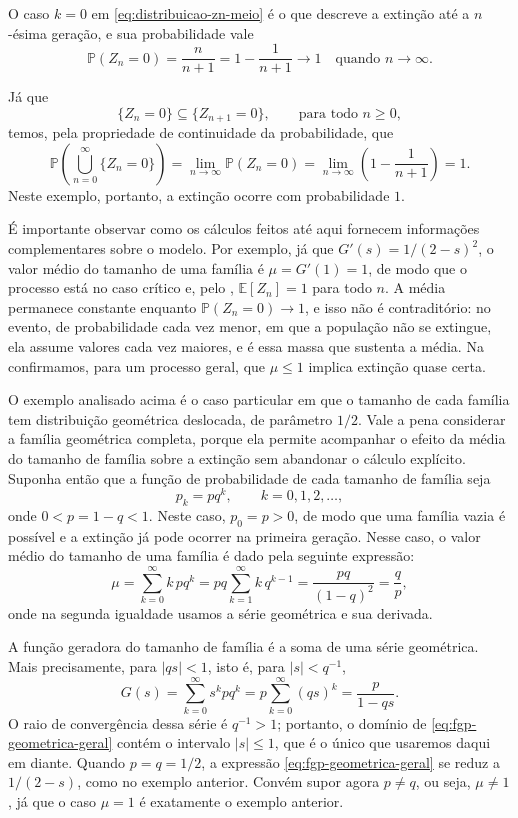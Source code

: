 \documentclass[12pt,portuguese]{article}
\theoremstyle{definition}
\theoremstyle{plainexercise}
\theoremstyle{starredexercise}
\theoremstyle{definition}
\begin{document}
O caso $k=0$ em \eqref{eq:distribuicao-zn-meio} é o que descreve a extinção até
a $n$-ésima geração, e sua probabilidade vale
\[
\mathbb{P}(Z_n=0)=\frac{n}{n+1}=1-\frac{1}{n+1}\longrightarrow 1
\quad\text{quando } n\to\infty.
\]

Já que
\[
\{Z_{n}=0\}\subseteq \{Z_{n+1}=0\},\qquad \text{para todo } n\geqslant 0,
\]
temos, pela propriedade de continuidade da probabilidade, que
\[
\mathbb{P}\left( \bigcup_{n=0}^{\infty} \{Z_n=0\} \right)
=
\lim_{n\to\infty} \mathbb{P}(Z_n=0)
=
\lim_{n\to\infty} \left(1-\frac{1}{n+1}\right) = 1.
\]
Neste exemplo, portanto, a
extinção ocorre com probabilidade $1$.


\medskip
É importante observar como os cálculos feitos até aqui fornecem
informações complementares sobre o modelo. Por exemplo, já que
$G'(s)=1/(2-s)^2$, o valor médio do tamanho de uma
família é $\mu=G'(1)=1$, de modo que o processo está no caso crítico e, pelo
, $\mathbb{E}[Z_n]=1$ para todo $n$. A média permanece
constante enquanto $\mathbb{P}(Z_n=0)\to 1$, e isso não é contraditório: no
evento, de probabilidade cada vez menor, em que a população não se extingue,
ela assume valores cada vez maiores, e é essa massa que sustenta a média. Na
 confirmamos, para um processo geral, que $\mu\leqslant 1$
implica extinção quase certa.


\bigskip

O exemplo analisado acima é o caso particular em que o tamanho de cada família tem
distribuição geométrica deslocada, de parâmetro $1/2$. Vale a pena
considerar a família geométrica completa, porque ela permite acompanhar o efeito
da média do tamanho de família sobre a extinção sem abandonar o cálculo
explícito. Suponha então que a função de probabilidade de cada tamanho de
família seja
\[
p_k=pq^k,
\qquad k=0,1,2,\ldots,
\]
onde $0<p=1-q<1$. Neste caso, $p_0=p>0$, de modo que uma família vazia é
possível e a extinção já pode ocorrer na primeira geração.
Nesse caso, o valor médio do tamanho de uma família é dado pela seguinte expressão:
\[
\mu=\sum_{k=0}^{\infty}k\,pq^k
=pq\sum_{k=1}^{\infty}k\,q^{k-1}
=\frac{pq}{(1-q)^2}
=\frac{q}{p},
\]
onde na segunda igualdade usamos a série geométrica e sua derivada.

A função geradora do tamanho de família é a soma de uma série
geométrica. Mais precisamente, para $|qs|<1$, isto é, para $|s|<q^{-1}$,
\begin{equation}\label{eq:fgp-geometrica-geral}
G(s)=\sum_{k=0}^{\infty}s^k pq^k
=p\sum_{k=0}^{\infty}(qs)^k
=\frac{p}{1-qs}.
\end{equation}
O raio de convergência dessa série é $q^{-1}>1$; portanto, o domínio de
\eqref{eq:fgp-geometrica-geral} contém o intervalo $|s|\leqslant 1$, que é o
único que usaremos daqui em diante. Quando $p=q=1/2$, a expressão
\eqref{eq:fgp-geometrica-geral} se reduz a $1/(2-s)$, como no exemplo anterior.
Convém supor agora $p\neq q$, ou seja, $\mu\neq 1$, já que o caso $\mu=1$ é exatamente
o exemplo anterior.
\end{document}
